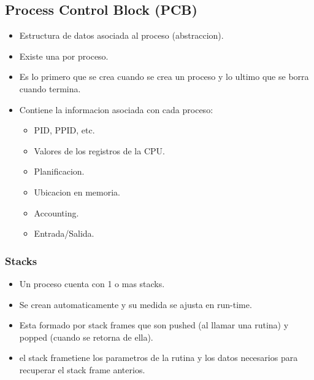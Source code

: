 \subsection{Process Control Block (PCB)}
\begin{itemize}
    \item Estructura de datos asociada al proceso (abstraccion).
    \item Existe una por proceso.
    \item Es lo primero que se crea cuando se crea un proceso y lo ultimo que se borra cuando termina.
    \item Contiene la informacion asociada con cada proceso:
        \begin{itemize}
            \item PID, PPID, etc.
            \item Valores de los registros de la CPU.
            \item Planificacion.
            \item Ubicacion en memoria.
            \item Accounting.
            \item Entrada/Salida.
        \end{itemize}
\end{itemize}

\subsubsection{Stacks}
\begin{itemize}
    \item Un proceso cuenta con 1 o mas stacks.
    \item Se crean automaticamente y su medida se ajusta en run-time.
    \item Esta formado por stack frames que son pushed (al llamar una rutina) y popped (cuando se retorna de ella).
    \item el stack frametiene los parametros de la rutina y los datos necesarios para recuperar el stack frame anterios.
\end{itemize}

